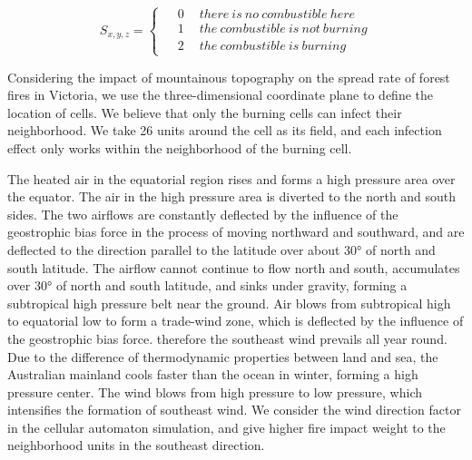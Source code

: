 \documentclass{mcmthesis}
\begin{document}
\begin{equation}
S_{x,y,z}=
\begin{cases}
  & \text{ 0 }\ ~~\   there\ is\ no\ combustible\ here \\
  & \text{ 1 }\ ~~\   the\ combustible\ is\ not\ burning\\
  & \text{ 2 }\ ~~\   the\ combustible\ is\ burning
\end{cases}
\end{equation}

Considering the impact of mountainous topography on the spread rate of forest fires in Victoria, we use the three-dimensional coordinate plane to define the location of cells. We believe that only the burning cells can infect their neighborhood. We take 26 units around the cell as its field, and each infection effect only works within the neighborhood of the burning cell.

The heated air in the equatorial region rises and forms a high pressure area over the equator. The air in the high pressure area is diverted to the north and south sides. The two airflows are constantly deflected by the influence of the geostrophic bias force in the process of moving northward and southward, and are deflected to the direction parallel to the latitude over about 30° of north and south latitude. The airflow cannot continue to flow north and south, accumulates over 30° of north and south latitude, and sinks under gravity, forming a subtropical high pressure belt near the ground. Air blows from subtropical high to equatorial low to form a trade-wind zone, which is deflected by the influence of the geostrophic bias force. therefore the southeast wind prevails all year round. Due to the difference of thermodynamic properties between land and sea, the Australian mainland cools faster than the ocean in winter, forming a high pressure center. The wind blows from high pressure to low pressure, which intensifies the formation of southeast wind. We consider the wind direction factor in the cellular automaton simulation, and give higher fire impact weight to the neighborhood units in the southeast direction.
\end{document}
